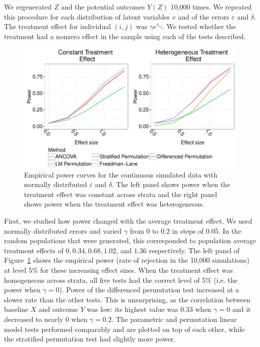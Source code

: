 \documentclass[12pt]{article}
\begin{document}
We regenerated $Z$ and the potential outcomes $Y(Z)$ 10,000 times.
We repeated this procedure for each distribution of latent variables $v$ and of the errors $\varepsilon$ and $\delta$.
The treatment effect for individual $(i, j)$ was $\gamma e^{v_{ij}}$.
We tested whether the treatment had a nonzero effect in the sample using each of the tests described.

\begin{figure}[h]
\centering
\includegraphics[width = \textwidth]{fig/continuous_outcomes_simulation_power.pdf}
\caption{Empirical power curves for the continuous simulated data with normally distributed $\varepsilon$ and $\delta$. The left panel shows power when the treatment effect was constant across strata and the right panel shows power when the treatment effect was heterogeneous.}
\label{fig:continuous_outcomes_sim_power}
\end{figure}

First, we studied how power changed with the average treatment effect.
We used normally distributed errors and varied $\gamma$ from $0$ to $0.2$ in steps of $0.05$.
In the random populations that were generated, this corresponded to population average treatment effects of $0, 0.34, 0.68, 1.02$, and $1.36$ respectively.
The left panel of Figure~\ref{fig:continuous_outcomes_sim_power} shows the empirical power (rate of rejection in the 10,000 simulations) at level 5\% for these increasing effect sizes.
When the treatment effect was homogeneous across strata, all five tests had the correct level of 5\% (i.e. the power when $\gamma = 0$).
Power of the differenced permutation test increased at a slower rate than the other tests.
This is unsurprising, as the correlation between baseline $X$ and outcome $Y$ was low:
its highest value was $0.33$ when $\gamma=0$ and it decreased to nearly $0$ when $\gamma=0.2$.
The parametric and permutation linear model tests performed comparably and are plotted on top of each other, while the stratified permutation test had slightly more power.
\end{document}
